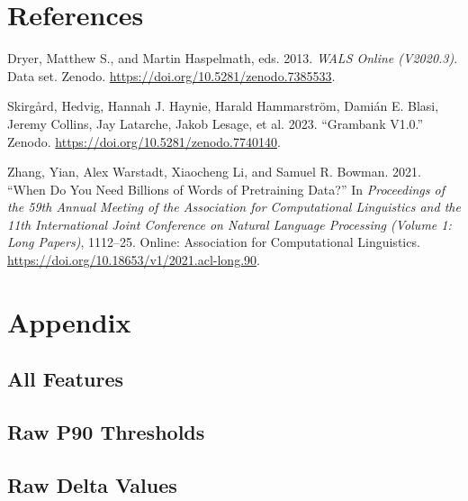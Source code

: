 \documentclass[
  letterpaper,
  DIV=11,
  numbers=noendperiod]{scrreprt}
\newlength{\cslhangindent}
\newenvironment{CSLReferences}[2] %
 {\begin{list}{}{%
  \setlength{\itemindent}{0pt}
  \setlength{\leftmargin}{0pt}
  \setlength{\parsep}{0pt}
  \ifodd #1
   \setlength{\leftmargin}{\cslhangindent}
   \setlength{\itemindent}{-1\cslhangindent}
  \fi
  \setlength{\itemsep}{#2\baselineskip}}}
 {\end{list}}
\begin{document}

\chapter*{References}\label{references}


\label{refs}
\begin{CSLReferences}{1}{0}
Dryer, Matthew S., and Martin Haspelmath, eds. 2013. \emph{WALS Online
(V2020.3)}. Data set. Zenodo.
\url{https://doi.org/10.5281/zenodo.7385533}.

Skirgård, Hedvig, Hannah J. Haynie, Harald Hammarström, Damián E. Blasi,
Jeremy Collins, Jay Latarche, Jakob Lesage, et al. 2023. {``Grambank
V1.0.''} Zenodo. \url{https://doi.org/10.5281/zenodo.7740140}.

Zhang, Yian, Alex Warstadt, Xiaocheng Li, and Samuel R. Bowman. 2021.
{``When Do You Need Billions of Words of Pretraining Data?''} In
\emph{Proceedings of the 59th Annual Meeting of the Association for
Computational Linguistics and the 11th International Joint Conference on
Natural Language Processing (Volume 1: Long Papers)}, 1112--25. Online:
Association for Computational Linguistics.
\url{https://doi.org/10.18653/v1/2021.acl-long.90}.

\end{CSLReferences}


\chapter*{Appendix}\label{appendix}


\section*{All Features}\label{all-features}


\section*{Raw P90 Thresholds}\label{raw-p90-thresholds}


\section*{Raw Delta Values}\label{raw-delta-values}

\end{document}
